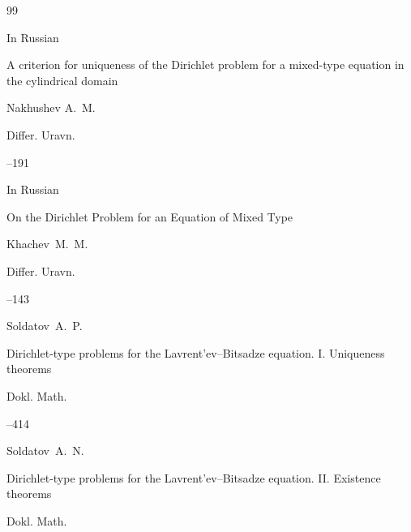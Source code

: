\begin{thebibliography}{99}

\lang In Russian

\paper A criterion for uniqueness of the Dirichlet problem for a mixed-type equation in the cylindrical domain

\by  Nakhushev A.~M.

\jour Differ. Uravn.




--191





\lang In Russian

\paper On the Dirichlet Problem for an Equation of Mixed Type

\by  Khachev~M.~M.

\jour Differ. Uravn.




--143






\by Soldatov~A.~P.

\paper Dirichlet-type problems for the Lavrent'ev--Bitsadze equation. I. Uniqueness theorems


\jour Dokl. Math.




--414




\by Soldatov~A.~N.

\paper Dirichlet-type problems for the Lavrent'ev--Bitsadze equation. II. Existence theorems


\jour Dokl. Math.





\end{thebibliography}
